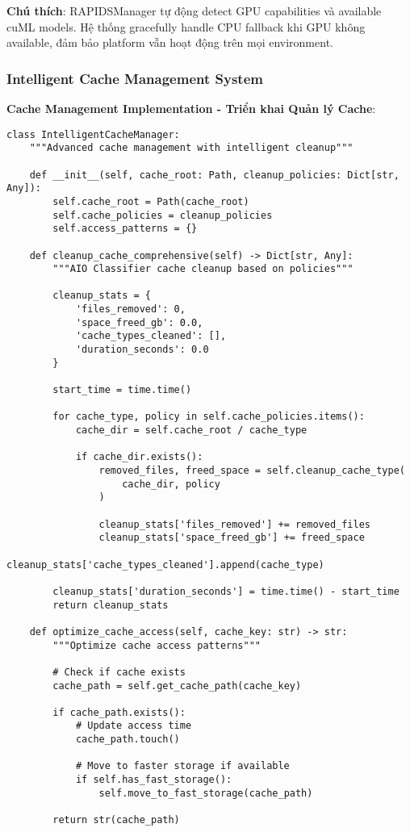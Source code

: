 \textbf{Chú thích}: RAPIDSManager tự động detect GPU capabilities và available cuML models. Hệ thống gracefully handle CPU fallback khi GPU không available, đảm bảo platform vẫn hoạt động trên mọi environment.

\subsubsection{Intelligent Cache Management System}

\textbf{Cache Management Implementation - Triển khai Quản lý Cache}:

\begin{verbatim}
class IntelligentCacheManager:
    """Advanced cache management with intelligent cleanup"""
    
    def __init__(self, cache_root: Path, cleanup_policies: Dict[str, Any]):
        self.cache_root = Path(cache_root)
        self.cache_policies = cleanup_policies
        self.access_patterns = {}
        
    def cleanup_cache_comprehensive(self) -> Dict[str, Any]:
        """AIO Classifier cache cleanup based on policies"""
        
        cleanup_stats = {
            'files_removed': 0,
            'space_freed_gb': 0.0,
            'cache_types_cleaned': [],
            'duration_seconds': 0.0
        }
        
        start_time = time.time()
        
        for cache_type, policy in self.cache_policies.items():
            cache_dir = self.cache_root / cache_type
            
            if cache_dir.exists():
                removed_files, freed_space = self.cleanup_cache_type(
                    cache_dir, policy
                )
                
                cleanup_stats['files_removed'] += removed_files
                cleanup_stats['space_freed_gb'] += freed_space
                cleanup_stats['cache_types_cleaned'].append(cache_type)
                
        cleanup_stats['duration_seconds'] = time.time() - start_time
        return cleanup_stats
        
    def optimize_cache_access(self, cache_key: str) -> str:
        """Optimize cache access patterns"""
        
        # Check if cache exists
        cache_path = self.get_cache_path(cache_key)
        
        if cache_path.exists():
            # Update access time
            cache_path.touch()
            
            # Move to faster storage if available
            if self.has_fast_storage():
                self.move_to_fast_storage(cache_path)
                
        return str(cache_path)
\end{verbatim}


